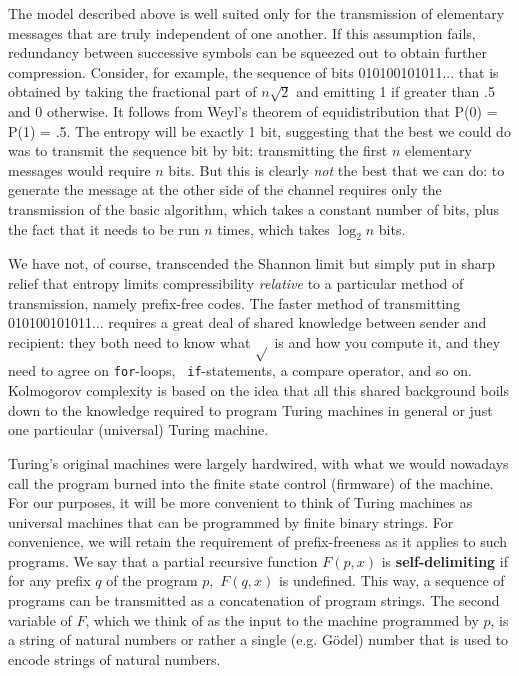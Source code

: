 The model described above is well suited only for the transmission of
elementary messages that are truly independent of one another. If this
assumption fails, redundancy between successive symbols can be squeezed out to
obtain further compression. Consider, for example, the sequence of bits
010100101011...  that is obtained by taking the fractional part of $n\sqrt{2}$
and emitting 1 if greater than .5 and 0 otherwise. It follows from Weyl's
theorem of equidistribution that P(0) = P(1) = .5. The entropy will be exactly
1 bit, suggesting that the best we could do was to transmit the sequence bit
by bit: transmitting the first $n$ elementary messages would require $n$
bits. But this is clearly {\it not} the best that we can do: to generate the
message at the other side of the channel requires only the transmission of the
basic algorithm, which takes a constant number of bits, plus the fact that it
needs to be run $n$ times, which takes $\log_2 n$ bits.

We have not, of course, transcended the Shannon limit but simply put in sharp
relief that entropy limits compressibility {\it relative} to a
particular method of transmission, namely prefix-free codes. The faster method
of transmitting 010100101011... requires a great deal of shared knowledge
between sender and recipient: they both need to know what $\sqrt{}$ is and how
you compute it, and they need to agree on {\tt for}-loops, {\tt
  if}-statements, a compare operator, and so on. Kolmogorov complexity is
based on the idea that all this shared background boils down to the knowledge
required to program Turing machines in general or just one particular
(universal) Turing machine.

Turing's original machines were largely hardwired, with what we would nowadays
call the program burned into the finite state control (firmware) of the
machine. For our purposes, it will be more convenient to think of Turing
machines as universal machines that can be programmed by finite binary
strings.  For convenience, we will retain the requirement of prefix-freeness
as it applies to such programs. We say that a partial recursive function
$F(p,x)$ is {\bf self-delimiting} if
for any prefix $q$ of the program $p,$ $F(q,x)$ is undefined. This way, a
sequence of programs can be transmitted as a concatenation of program
strings. The second variable of $F$, which we think of as the input to the
machine programmed by $p$, is a string of natural numbers or rather a single
(e.g. G\"odel) number that is used to encode strings of natural numbers.

